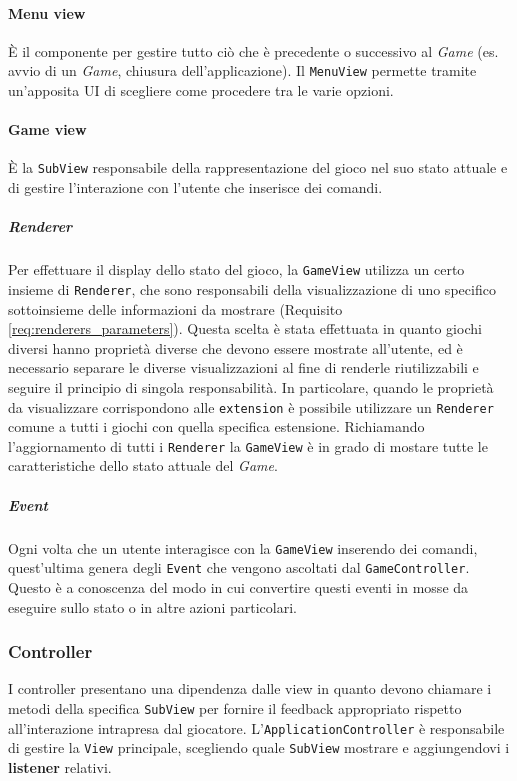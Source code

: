\paragraph{Menu view} 
È il componente per gestire tutto ciò che è precedente o successivo al \textit{Game} (es. avvio di un \textit{Game}, chiusura dell'applicazione).
%
Il \texttt{MenuView} permette tramite un'apposita UI di scegliere come procedere tra le varie opzioni.

\paragraph{Game view}

È la \texttt{SubView} responsabile della rappresentazione del gioco nel suo stato attuale e di gestire l'interazione con l'utente che inserisce dei comandi.

\subparagraph{Renderer}
Per effettuare il display dello stato del gioco, la \texttt{GameView} utilizza un certo insieme di \texttt{Renderer}, che sono responsabili della visualizzazione di uno specifico sottoinsieme delle informazioni da mostrare (Requisito \ref{req:renderers_parameters}).
%
Questa scelta è stata effettuata in quanto giochi diversi hanno proprietà diverse che devono essere mostrate all'utente, ed è necessario separare le diverse visualizzazioni al fine di renderle riutilizzabili e seguire il principio di singola responsabilità.
%
In particolare, quando le proprietà da visualizzare corrispondono alle \texttt{extension} è possibile utilizzare un \texttt{Renderer} comune a tutti i giochi con quella specifica estensione.
%
Richiamando l'aggiornamento di tutti i \texttt{Renderer} la \texttt{GameView} è in grado di mostare tutte le caratteristiche dello stato attuale del \textit{Game}.

\subparagraph{Event}
Ogni volta che un utente interagisce con la \texttt{GameView} inserendo dei comandi, quest'ultima genera degli \texttt{Event} che vengono ascoltati dal \texttt{GameController}.
%
Questo è a conoscenza del modo in cui convertire questi eventi in mosse da eseguire sullo stato o in altre azioni particolari.


\subsubsection{Controller}
I controller presentano una dipendenza dalle view in quanto devono chiamare i metodi della specifica \texttt{SubView} per fornire il feedback appropriato rispetto all'interazione intrapresa dal giocatore.
%
L'\texttt{ApplicationController} è responsabile di gestire la \texttt{View} principale, scegliendo quale \texttt{SubView} mostrare e aggiungendovi i \textbf{listener} relativi.

